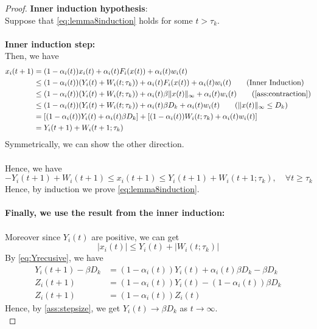 \begin{proof}
    \textbf{Inner induction hypothesis}:\\
    Suppose that \autoref{eq:lemma8induction} holds for some $t>\tau_k$. \\
    \\
    \textbf{Inner induction step: }\\
    Then, we have
    \begin{align*}
         x_i(t+1) &= (1-\alpha_i(t))x_i(t) + \alpha_i(t)F_i(x(t)) + \alpha_i(t)w_i(t)\\
         &\le (1-\alpha_i(t))(Y_i(t) + W_i(t;\tau_k)) + \alpha_i(t)F_i(x(t)) + \alpha_i(t)w_i(t)\tag{Inner Induction}\\
         &\le (1-\alpha_i(t))(Y_i(t) + W_i(t;\tau_k)) + \alpha_i(t)\beta\|x(t)\|_\infty + \alpha_i(t)w_i(t)\tag{\autoref{ass:contraction}}\\
         &\le (1-\alpha_i(t))(Y_i(t) + W_i(t;\tau_k)) + \alpha_i(t)\beta D_k + \alpha_i(t)w_i(t)\tag{$\|x(t)\|_\infty \le D_k$}\\
         & =[(1-\alpha_i(t))Y_i(t) + \alpha_i(t)\beta D_k] + [(1-\alpha_i(t)) W_i(t;\tau_k) + \alpha_i(t)w_i(t)]\\
         &= Y_i(t+1) + W_i(t+1;\tau_k)
    \end{align*}
    Symmetrically, we can show the other direction.\\
    \\
    Hence, we have
    $$
    -Y_i(t+1) + W_i(t+1)\le x_i(t+1)\le Y_i(t+1) + W_i(t+1;\tau_k),\quad\forall t\ge \tau_k
    $$
    Hence, by induction we prove \autoref{eq:lemma8induction}. \\
    \\
    \textbf{Finally, we use the result from the inner induction: }\\
    \\
    Moreover since $Y_i(t)$ are positive, we can get
    \begin{equation}\label{eq:xiboundedlast}
        |x_i(t)| \le Y_i(t) + |W_i(t;\tau_k)|
    \end{equation}
    By \autoref{eq:Yrecusive}, we have
    \begin{align*}
        Y_i(t+1) -\beta D_k &= (1-\alpha_i(t))Y_i(t)+\alpha_i(t)\beta D_k -\beta D_k\\
        Z_i(t+1) &= (1-\alpha_i(t))Y_i(t)-(1-\alpha_i(t))\beta D_k\tag{$Z_i(t):= Y_i(t)-\beta D_k$}\\
        Z_i(t+1) &= (1-\alpha_i(t)) Z_i(t)
    \end{align*}
    Hence, by \autoref{ass:stepsize}, we get $Y_i(t)\to \beta D_k$ as $t\to \infty$.\\

\end{proof}
